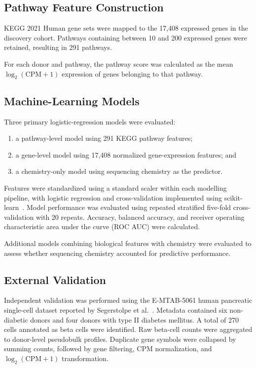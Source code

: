 \documentclass[conference]{IEEEtran}
\begin{document}
\subsection{Pathway Feature Construction}

KEGG 2021 Human gene sets were mapped to the 17,408 expressed genes in the discovery cohort. Pathways containing between 10 and 200 expressed genes were retained, resulting in 291 pathways.

For each donor and pathway, the pathway score was calculated as the mean $\log_2(\mathrm{CPM}+1)$ expression of genes belonging to that pathway.

\subsection{Machine-Learning Models}

Three primary logistic-regression models were evaluated:

\begin{enumerate}
    \item a pathway-level model using 291 KEGG pathway features;
    \item a gene-level model using 17,408 normalized gene-expression features; and
    \item a chemistry-only model using sequencing chemistry as the predictor.
\end{enumerate}

Features were standardized using a standard scaler within each modelling pipeline, with logistic regression and cross-validation implemented using scikit-learn~\cite{pedregosa2011}. Model performance was evaluated using repeated stratified five-fold cross-validation with 20 repeats. Accuracy, balanced accuracy, and receiver operating characteristic area under the curve (ROC AUC) were calculated.

Additional models combining biological features with chemistry were evaluated to assess whether sequencing chemistry accounted for predictive performance.

\subsection{External Validation}

Independent validation was performed using the E-MTAB-5061 human pancreatic single-cell dataset reported by Segerstolpe et al.~\cite{segerstolpe2016}. Metadata contained six non-diabetic donors and four donors with type II diabetes mellitus.
A total of 270 cells annotated as beta cells were identified. Raw beta-cell counts were aggregated to donor-level pseudobulk profiles. Duplicate gene symbols were collapsed by summing counts, followed by gene filtering, CPM normalization, and $\log_2(\mathrm{CPM}+1)$ transformation.
\end{document}
